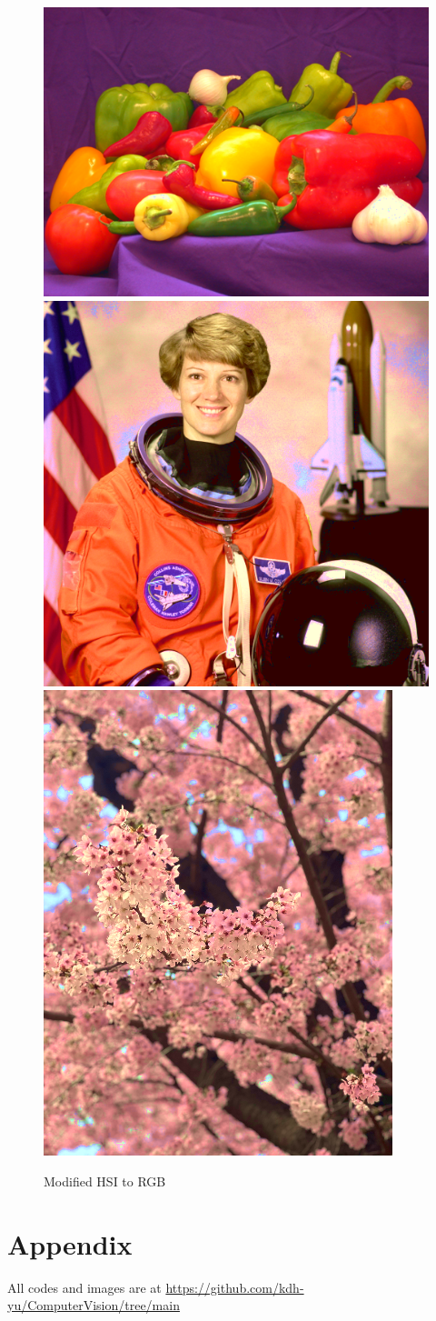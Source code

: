\documentclass{article}
\begin{document}
\begin{figure}[!ht]
    \centering
    \includegraphics[width=.356\textwidth]{fig/HSI2RGB_peppers.png}
    \includegraphics[width=.267\textwidth]{fig/HSI2RGB_astronaut.png}
    \includegraphics[width=.2\textwidth]{fig/HSI2RGB_cb.png}
    \caption{Modified HSI to RGB}
\end{figure}

\section*{Appendix}
All codes and images are at \url{https://github.com/kdh-yu/ComputerVision/tree/main}
\end{document}
